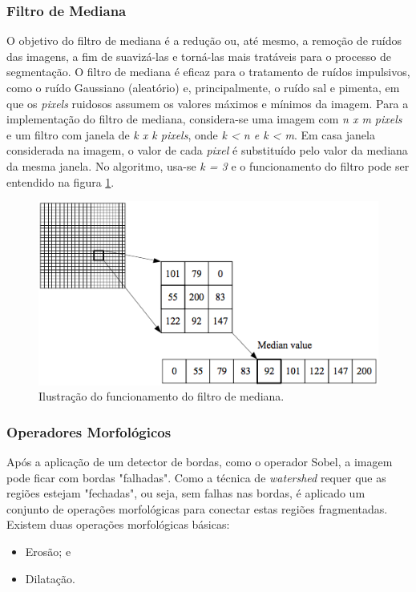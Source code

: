 \subsubsection{Filtro de Mediana}
O objetivo do filtro de mediana é a redução ou, até mesmo, a remoção de ruídos das imagens, a fim de suavizá-las e torná-las mais tratáveis para o processo de segmentação. O filtro de mediana é eficaz para o tratamento de ruídos impulsivos, como o ruído Gaussiano (aleatório) e, principalmente, o ruído sal e pimenta, em que os \textit{pixels} ruidosos assumem os valores máximos e mínimos da imagem.
Para a implementação do filtro de mediana, considera-se uma imagem com \textit{n x m pixels} e um filtro com janela de \textit{k x k pixels}, onde \textit{k < n e k < m}. Em casa janela considerada na imagem, o valor de cada \textit{pixel} é substituído pelo valor da mediana da mesma janela. No algoritmo, usa-se \textit{k = 3} e o funcionamento do filtro pode ser entendido na figura \ref{fig:filtromediana}.

	\begin{figure}[!htb]
       \begin{center}  
          \includegraphics[width=0.8\columnwidth]{img/filtromediana.jpg}
           \caption{\label{fig:filtromediana}Ilustração do funcionamento do filtro de mediana. \cite{ruparelia2012implementation}}
       \end{center}
   \end{figure}
   

\subsubsection{Operadores Morfológicos}
Após a aplicação de um detector de bordas, como o operador Sobel, a imagem pode ficar com bordas "falhadas". Como a técnica de \textit{watershed} requer que as regiões estejam "fechadas", ou seja, sem falhas nas bordas, é aplicado um conjunto de operações morfológicas para conectar estas regiões fragmentadas. 
Existem duas operações morfológicas básicas:
\begin{itemize}
    \item Erosão; e
    \item Dilatação.
\end{itemize}    


